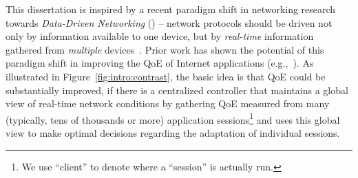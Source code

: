 This dissertation is inspired by a recent paradigm shift in networking research 
towards {\em Data-Driven Networking} ({\em \ddn}) -- network protocols should 
be driven not only by information available to one device, but by {\em real-time} 
information gathered from {\em multiple} devices~\cite{ddn-comsnet}.
Prior work has shown the potential of this paradigm shift in improving the 
QoE of Internet applications (e.g.,~\cite{sigcomm12,footprint}).
As illustrated in Figure~\ref{fig:intro:contrast}, 
the basic idea is that QoE could be substantially improved, if 
there is a centralized controller that maintains a global view of real-time 
network conditions by gathering QoE measured from many (typically, tens of 
thousands or more) application sessions\footnote{We use ``client'' to denote 
where a ``session'' is actually run.} and uses this global view to make  
optimal decisions regarding the adaptation of individual sessions.






